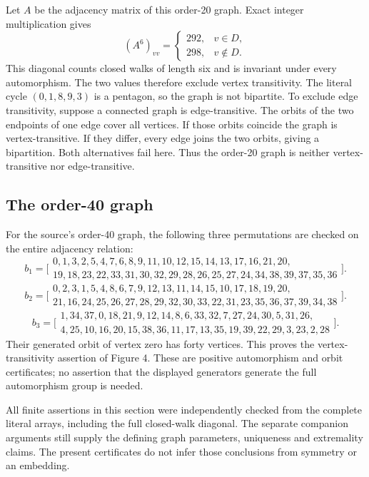 Let $A$ be the adjacency matrix of this order-20 graph. Exact integer
multiplication gives
\[
 (A^6)_{vv}=\begin{cases}292,&v\in D,\\298,&v\notin D.\end{cases}
\]
This diagonal counts closed walks of length six and is invariant under
every automorphism. The two values therefore exclude vertex transitivity.
The literal cycle $(0,1,8,9,3)$ is a pentagon, so the graph is not bipartite.
To exclude edge transitivity, suppose a connected graph is edge-transitive.
The orbits of the two endpoints of one edge cover all vertices. If those
orbits coincide the graph is vertex-transitive. If they differ, every edge
joins the two orbits, giving a bipartition. Both alternatives fail here.
Thus the order-20 graph is neither vertex-transitive nor edge-transitive.

\subsection{The order-40 graph}
For the source's order-40 graph, the following three permutations are
checked on the entire adjacency relation:
\[
b_1=\bigl[\begin{gathered}
0,1,3,2,5,4,7,6,8,9,11,10,12,15,14,13,17,16,21,20,\\
19,18,23,22,33,31,30,32,29,28,26,25,27,24,34,38,39,37,35,36
\end{gathered}\bigr].
\]
\[
b_2=\bigl[\begin{gathered}
0,2,3,1,5,4,8,6,7,9,12,13,11,14,15,10,17,18,19,20,\\
21,16,24,25,26,27,28,29,32,30,33,22,31,23,35,36,37,39,34,38
\end{gathered}\bigr].
\]
\[
b_3=\bigl[\begin{gathered}
1,34,37,0,18,21,9,12,14,8,6,33,32,7,27,24,30,5,31,26,\\
4,25,10,16,20,15,38,36,11,17,13,35,19,39,22,29,3,23,2,28
\end{gathered}\bigr].
\]
Their generated orbit of vertex zero has forty vertices. This proves
the vertex-transitivity assertion of Figure 4. These are positive
automorphism and orbit certificates; no assertion that the displayed
generators generate the full automorphism group is needed.

All finite assertions in this section were independently checked from
the complete literal arrays, including the full closed-walk diagonal.
The separate companion arguments still supply the defining graph
parameters, uniqueness and extremality claims. The present certificates
do not infer those conclusions from symmetry or an embedding.
